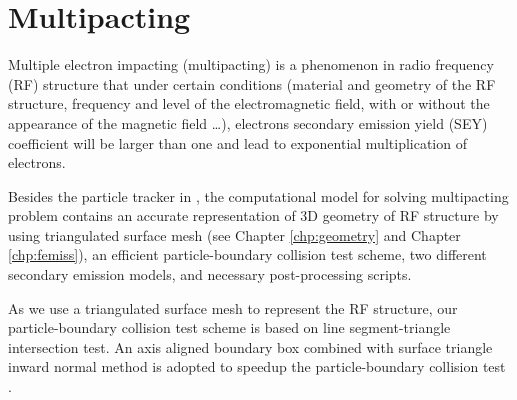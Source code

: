\chapter{Multipacting}
\label{chp:multpact}
Multiple electron impacting (multipacting) is a phenomenon in radio frequency (RF) structure that under certain conditions (material and geometry of the RF structure, frequency and level of the electromagnetic field, with or without the appearance of the magnetic field \ldots), electrons secondary emission yield (SEY) coefficient will be larger than one and lead to exponential multiplication of electrons.  

Besides the particle tracker in \opal, the computational model for solving multipacting problem contains an accurate representation of 3D geometry of RF structure by using triangulated surface mesh (see Chapter \ref{chp:geometry} and Chapter \ref{chp:femiss}), an efficient particle-boundary collision test scheme, two different secondary emission models, and necessary post-processing scripts.

As we use a triangulated surface mesh to represent the RF structure, our particle-boundary collision test scheme is based on line segment-triangle intersection test. An axis aligned boundary box combined with surface triangle inward normal method is adopted to speedup the particle-boundary collision test \cite{WangHB2010}.

